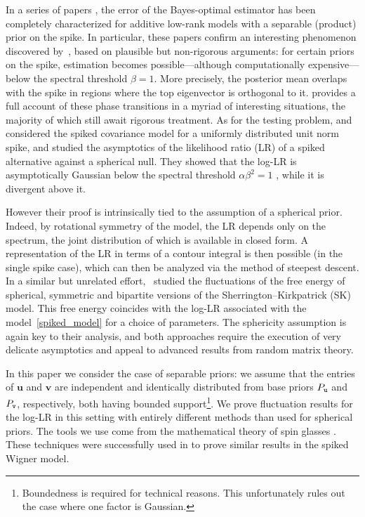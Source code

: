 \documentclass[final,12pt]{colt2018} %
\newcommand{\utt}{\textup{\texttt{u}}}
\newcommand{\vtt}{\textup{\texttt{v}}}
\renewcommand{\u}{\bm{u}}
\renewcommand{\v}{\bm{v}}
\begin{document}
In a series of papers \citep{korada2009exact,krzakala2016mutual,barbier2016mutual,deshpande2016asymptotic,lelarge2016fundamental_colt,miolane2017fundamental}, the error of the Bayes-optimal estimator has been completely characterized for additive low-rank models with a separable (product) prior on the spike. In particular, these papers confirm an interesting phenomenon discovered by~\cite{lesieur2015mmse,lesieur2015phase}, based on plausible but non-rigorous arguments: for certain priors on the spike, estimation becomes possible---although computationally expensive---below the spectral threshold $\beta=1$. More precisely, the posterior mean overlaps with the spike in regions where the top eigenvector is orthogonal to it. \cite{lesieur2017constrained} provides a full account of these phase transitions in a myriad of interesting situations, the majority of which still await rigorous treatment.  
As for the testing problem, \cite{onatski2013asymptotic,onatski2014signal} and \cite{johnstone2015testing} considered the spiked covariance model for a uniformly distributed unit norm spike, and studied the asymptotics of the likelihood ratio (LR) of a spiked alternative against a spherical null. They showed that the log-LR is asymptotically Gaussian below the spectral threshold  $\alpha\beta^2=1$ \citep[which in this setting is known as the BBP threshold, after][]{baik2005phase}, while it is divergent above it. 


    
However their proof is intrinsically tied to the assumption of a spherical prior. Indeed, by rotational symmetry of the model, the LR depends only on the spectrum, the joint distribution of which is available in closed form. A representation of the LR in terms of a contour integral is then possible (in the single spike case), which can then be analyzed via the method of steepest descent. In a similar but unrelated effort,~\cite{baik2016fluctuations,baik2017fluctuations,baik2017fluctuations_bipartite} studied the fluctuations of the free energy of spherical, symmetric and bipartite versions of the Sherrington--Kirkpatrick (SK) model. This free energy coincides with the log-LR associated with the model~\eqref{spiked_model} for a choice of parameters. The sphericity assumption is again key to their analysis, and both approaches require the execution of very delicate asymptotics and appeal to advanced results from random matrix theory. 
 
In this paper we consider the case of separable priors: we assume that the entries of $\u$ and $\v$ are independent and identically distributed from base priors $P_{\utt}$ and $P_{\vtt}$, respectively, both having bounded support\footnote{Boundedness is required for technical reasons. This unfortunately rules out the case where one factor is Gaussian.}. We prove fluctuation results for the log-LR in this setting with entirely different methods than used for spherical priors.
The tools we use come from the mathematical theory of spin glasses \citep[see][]{talagrand2011mean1,talagrand2011mean2}. These techniques were successfully used in  \citep{alaoui2017finite} to prove similar results in the spiked Wigner model. 
\end{document}
